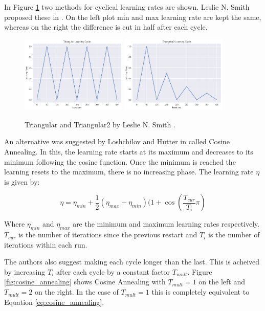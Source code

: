 In Figure \ref{fig:triangular_cyclical_learning_rate} two methods for cyclical learning rates are shown.
Leslie N. Smith proposed these in \cite{Smith_2015}.
On the left plot min and max learning rate are kept the same, whereas on the right the difference is cut in half after each cycle.


\begin{figure}[hbtp!]
    \centering
    \includegraphics[width=0.45\textwidth]{./img/triangular.png}
    \includegraphics[width=0.45\textwidth]{./img/triangular2.png}
    \caption{Triangular and Triangular2 by Leslie N. Smith \cite{Smith_2015}.}
    \label{fig:triangular_cyclical_learning_rate}
\end{figure}

An alternative was suggested by Loshchilov and Hutter in \cite{Loshchilov_Hutter_2016} called Cosine Annealing.
In this, the learning rate starts at its maximum and decreases to its minimum following the cosine function.
Once the minimum is reached the learning resets to the maximum, there is no increasing phase.
The learning rate $\eta$ is given by:

\begin{equation}
    \eta = \eta_{min} + \frac{1}{2}(\eta_{max} - \eta_{min})(1 + \cos(\frac{T_{cur}}{T_i}\pi)
    \label{eq:cosine_annealing}
\end{equation}

Where $\eta_{min}$ and $\eta_{max}$ are the minimum and maximum learning rates respectively.
$T_{cur}$ is the number of iterations since the previous restart and $T_i$ is the number of iterations within each run.

The authors also suggest making each cycle longer than the last.
This is acheived by increasing $T_i$ after each cycle by a constant factor $T_{mult}$.
Figure \ref{fig:cosine_annealing} shows Cosine Annealing with $T_{mult}=1$ on the left and $T_{mult}=2$ on the right.
In the case of $T_{mult}=1$ this is completely equivalent to Equation \ref{eq:cosine_annealing}.

